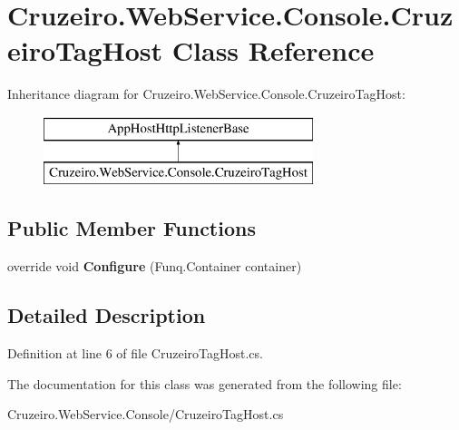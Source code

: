 \hypertarget{class_cruzeiro_1_1_web_service_1_1_console_1_1_cruzeiro_tag_host}{}\section{Cruzeiro.\+Web\+Service.\+Console.\+Cruzeiro\+Tag\+Host Class Reference}
\label{class_cruzeiro_1_1_web_service_1_1_console_1_1_cruzeiro_tag_host}
Inheritance diagram for Cruzeiro.\+Web\+Service.\+Console.\+Cruzeiro\+Tag\+Host\+:\begin{figure}[H]
\begin{center}
\leavevmode
\includegraphics[height=2.000000cm]{class_cruzeiro_1_1_web_service_1_1_console_1_1_cruzeiro_tag_host}
\end{center}
\end{figure}
\subsection*{Public Member Functions}
\begin{DoxyCompactItemize}
\item 
override void {\bfseries Configure} (Funq.\+Container container)\hypertarget{class_cruzeiro_1_1_web_service_1_1_console_1_1_cruzeiro_tag_host_a34e9dd58a90827c182fe8d0b54471dc6}{}\label{class_cruzeiro_1_1_web_service_1_1_console_1_1_cruzeiro_tag_host_a34e9dd58a90827c182fe8d0b54471dc6}

\end{DoxyCompactItemize}


\subsection{Detailed Description}


Definition at line 6 of file Cruzeiro\+Tag\+Host.\+cs.



The documentation for this class was generated from the following file\+:\begin{DoxyCompactItemize}
\item 
Cruzeiro.\+Web\+Service.\+Console/Cruzeiro\+Tag\+Host.\+cs\end{DoxyCompactItemize}
